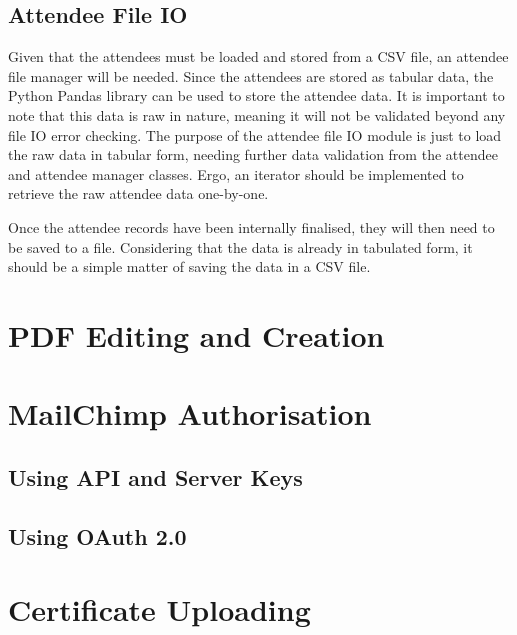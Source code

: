\documentclass[11pt]{article}
\begin{document}
\subsection{Attendee File IO}

Given that the attendees must be loaded and stored from a CSV file, an attendee file manager will be needed. Since the attendees are stored as tabular data, the Python Pandas library can be used to store the attendee data. It is important to note that this data is raw in nature, meaning it will not be validated beyond any file IO error checking. The purpose of the attendee file IO module is just to load the raw data in tabular form, needing further data validation from the attendee and attendee manager classes. Ergo, an iterator should be implemented to retrieve the raw attendee data one-by-one.

Once the attendee records have been internally finalised, they will then need to be saved to a file. Considering that the data is already in tabulated form, it should be a simple matter of saving the data in a CSV file.

\newpage

\section{PDF Editing and Creation}



\newpage

\section{MailChimp Authorisation}

\subsection{Using API and Server Keys}




\subsection{Using OAuth 2.0}



\newpage

\section{Certificate Uploading}
\end{document}
